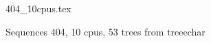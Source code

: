\documentclass[12pt,a4paper]{article}
\begin{document}
 
\begin{figure}
\caption*{Sequences 404, 10 cpus, 53 trees from treeechar}
{404_10cpus.tex}
\end{figure}
 
\end{document}

